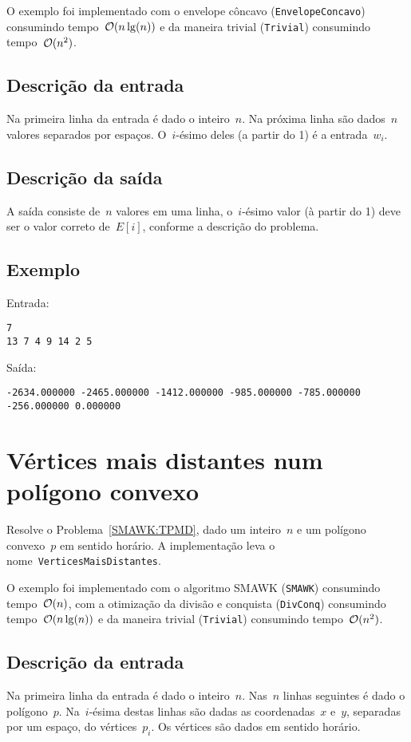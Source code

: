 O exemplo foi implementado com o envelope côncavo (\texttt{EnvelopeConcavo}) consumindo tempo~$\mathcal{O}(n\lg(n))$ e da maneira trivial (\texttt{Trivial}) consumindo tempo~$\mathcal{O}(n^2)$.

\subsection*{Descrição da entrada}
Na primeira linha da entrada é dado o inteiro~$n$. Na próxima linha são dados~$n$ valores separados por espaços. O~$i$-ésimo deles (a partir do 1) é a entrada~$w_i$.

\subsection*{Descrição da saída}
A saída consiste de~$n$ valores em uma linha, o~$i$-ésimo valor (à partir do 1) deve ser o valor correto de~$E[i]$, conforme a descrição do problema.

\subsection*{Exemplo}
Entrada:
\begin{verbatim}
7
13 7 4 9 14 2 5
\end{verbatim}
Saída:
\begin{verbatim}
-2634.000000 -2465.000000 -1412.000000 -985.000000 -785.000000 -256.000000 0.000000
\end{verbatim}


\section{Vértices mais distantes num polígono convexo} \label{PMDPC}

Resolve o Problema~\ref{SMAWK:TPMD}, dado um inteiro~$n$ e um polígono convexo~$p$ em sentido horário. A implementação leva o nome~\texttt{VerticesMaisDistantes}. 

O exemplo foi implementado com o algoritmo SMAWK (\texttt{SMAWK}) consumindo tempo~$\mathcal{O}(n)$, com a otimização da divisão e conquista (\texttt{DivConq}) consumindo tempo~$\mathcal{O}(n\lg(n))$ e da maneira trivial (\texttt{Trivial}) consumindo tempo~$\mathcal{O}(n^2)$.

\subsection*{Descrição da entrada}
Na primeira linha da entrada é dado o inteiro~$n$. Nas~$n$ linhas seguintes é dado o polígono~$p$. Na~$i$-ésima destas linhas são dadas as coordenadas~$x$ e~$y$, separadas por um espaço, do vértices~$p_i$. Os vértices são dados em sentido horário.

